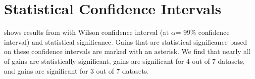 \section{Statistical Confidence Intervals}
\label{sec:statistical_tests}



 shows results from  with Wilson confidence interval \cite{brown2001_wilson_interval} (at $\alpha$= 99\% confidence interval) and statistical significance. Gains that are statistical significance based on these confidence intervals are marked with an asterisk. We find that nearly all of \gptf gains are statistically significant, \chatgpt gains are significant for 4 out of 7 datasets, and \gptt gains are significant for 3 out of 7 datasets.

